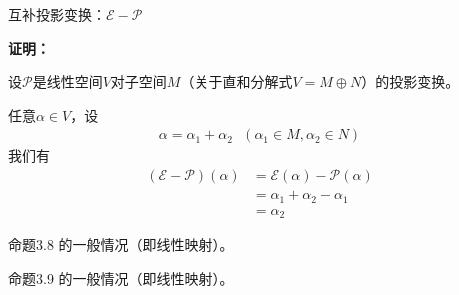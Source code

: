 \documentclass{article}
\begin{document}
\begin{zremark}
  互补投影变换：$\mathscr{E} - \mathscr{P}$
\end{zremark}

\textbf{证明：}

设$\mathscr{P}$是线性空间$V$对子空间$M$（关于直和分解式$V = M \oplus N$）的投影变换。

任意$\alpha \in V$，设
\begin{align*}
  \alpha = \alpha_1 + \alpha_2 \ \ \ (\alpha_1 \in M, \alpha_2 \in N)
\end{align*}
我们有
\begin{align*}
  (\mathscr{E} - \mathscr{P})(\alpha)
   & = \mathscr{E}(\alpha) - \mathscr{P}(\alpha) \\
   & = \alpha_1 + \alpha_2 - \alpha_1            \\
   & = \alpha_2
\end{align*}

\begin{zremark}
  命题3.8 的一般情况（即线性映射）。
\end{zremark}

\begin{zremark}
  命题3.9 的一般情况（即线性映射）。
\end{zremark}
\end{document}
